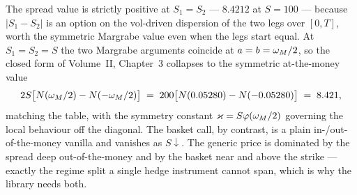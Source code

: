 \begin{remark}\label{rem:num:atmspread}
The spread value is strictly positive at $S_1 = S_2$ --- $8.4212$ at $S = 100$
--- because $|S_1 - S_2|$ is an option on the vol-driven dispersion of the two
legs over $[0,T]$, worth the symmetric Margrabe value even when the legs start
equal. At $S_1 = S_2 = S$ the two Margrabe arguments coincide at
$a = b = \omega_M/2$, so the closed form of Volume~II, Chapter~3 collapses to the
symmetric at-the-money value
\[
   2S\bigl[N(\omega_M/2) - N(-\omega_M/2)\bigr]
   \;=\; 200\bigl[N(0.05280) - N(-0.05280)\bigr]
   \;=\; 8.421,
\]
matching the table, with the symmetry constant $\varkappa = S\varphi(\omega_M/2)$
governing the local behaviour off the diagonal. The basket call, by contrast, is
a plain in-/out-of-the-money vanilla and vanishes as $S \downarrow$. The generic price is dominated by the spread deep out-of-the-money
and by the basket near and above the strike --- exactly the regime split a single
hedge instrument cannot span, which is why the library needs both.
\end{remark}

